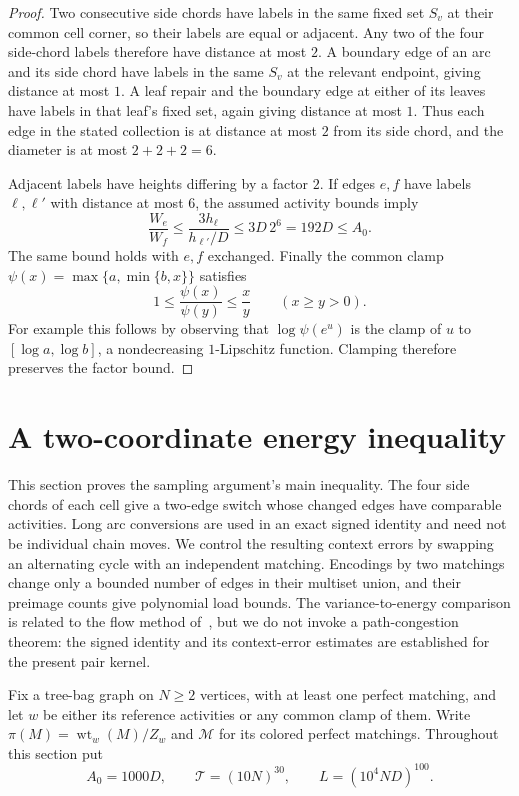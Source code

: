 \documentclass[11pt]{article}
\theoremstyle{definition}
\theoremstyle{remark}
\newcommand{\calM}{\mathcal M}
\newcommand{\calT}{\mathcal T}
\newcommand{\wt}{\operatorname{wt}}
\numberwithin{equation}{section}
\begin{document}
\begin{proof}
Two consecutive side chords have labels in the same fixed set $S_v$
at their common cell corner, so their labels are equal or adjacent.
Any two of the four side-chord labels therefore have distance at
most $2$.  A boundary edge of an arc and its side chord have labels
in the same $S_v$ at the relevant endpoint, giving distance at most
$1$.  A leaf repair and the boundary edge at either of its leaves
have labels in that leaf's fixed set, again giving distance at most
$1$.  Thus each edge in the stated collection is at distance at
most $2$ from its side chord, and the diameter is at most
$2+2+2=6$.

Adjacent labels have heights differing by a factor $2$.  If edges
$e,f$ have labels $\ell,\ell'$ with distance at most $6$, the
assumed activity bounds imply
\[
 \frac{W_e}{W_f}
 \le \frac{3h_\ell}{h_{\ell'}/D}
 \le 3D\,2^6=192D\le A_0.
\]
The same bound holds with $e,f$ exchanged.  Finally the common clamp
$\psi(x)=\max\{a,\min\{b,x\}\}$ satisfies
\[
 1\le\frac{\psi(x)}{\psi(y)}\le\frac{x}{y}
 \qquad (x\ge y>0).
\]
For example this follows by observing that
$\log\psi(e^u)$ is the clamp of $u$ to
$[\log a,\log b]$, a nondecreasing $1$-Lipschitz function.
Clamping therefore preserves the factor bound.
\end{proof}
\section{A two-coordinate energy inequality}
\label{sec:energy}

This section proves the sampling argument's main inequality. The four
side chords of each cell give a two-edge switch whose changed edges
have comparable activities. Long arc conversions are used in an exact
signed identity and need not be individual chain moves. We control the
resulting context errors by swapping an alternating cycle with an
independent matching. Encodings by two matchings change only a bounded
number of edges in their multiset union, and their preimage counts give
polynomial load bounds.
The variance-to-energy comparison is related to the flow method
of~\cite{Sinclair1992}, but we do not invoke a path-congestion theorem:
the signed identity and its context-error estimates are established
for the present pair kernel.

Fix a tree-bag graph on $N\ge2$ vertices, with at least one perfect
matching, and let $w$ be either its reference activities or any common
clamp of them.  Write $\pi(M)=\wt_w(M)/Z_w$ and $\calM$ for its colored
perfect matchings.  Throughout this section put
\begin{equation}
\label{eq:energy-constants}
 A_0=1000D,\qquad \calT=(10N)^{30},\qquad
 L=(10^4ND)^{100}.
\end{equation}
\end{document}
